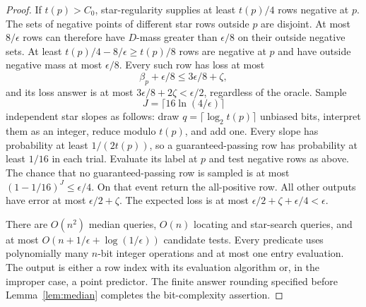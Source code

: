 \begin{proof}
If $t(p)>C_0$, star-regularity supplies at least $t(p)/4$ rows negative at $p$. The sets of negative points of different star rows outside $p$ are disjoint. At most $8/\epsilon$ rows can therefore have $D$-mass greater than $\epsilon/8$ on their outside negative sets. At least $t(p)/4-8/\epsilon\ge t(p)/8$ rows are negative at $p$ and have outside negative mass at most $\epsilon/8$. Every such row has loss at most
\[
 \beta_p+\epsilon/8\le3\epsilon/8+\zeta,
\]
and its loss answer is at most $3\epsilon/8+2\zeta<\epsilon/2$, regardless of the oracle. Sample
\[
 J=\lceil16\ln(4/\epsilon)\rceil
\]
independent star slopes as follows: draw $q=\lceil\log_2t(p)\rceil$ unbiased bits, interpret them as an integer, reduce modulo $t(p)$, and add one. Every slope has probability at least $1/(2t(p))$, so a guaranteed-passing row has probability at least $1/16$ in each trial. Evaluate its label at $p$ and test negative rows as above. The chance that no guaranteed-passing row is sampled is at most $(1-1/16)^J\le\epsilon/4$. On that event return the all-positive row. All other outputs have error at most $\epsilon/2+\zeta$. The expected loss is at most $\epsilon/2+\zeta+\epsilon/4<\epsilon$.

There are $O(n^2)$ median queries, $O(n)$ locating and star-search queries, and at most $O(n+1/\epsilon+\log(1/\epsilon))$ candidate tests. Every predicate uses polynomially many $n$-bit integer operations and at most one entry evaluation. The output is either a row index with its evaluation algorithm or, in the improper case, a point predictor. The finite answer rounding specified before Lemma~\ref{lem:median} completes the bit-complexity assertion.
\end{proof}

